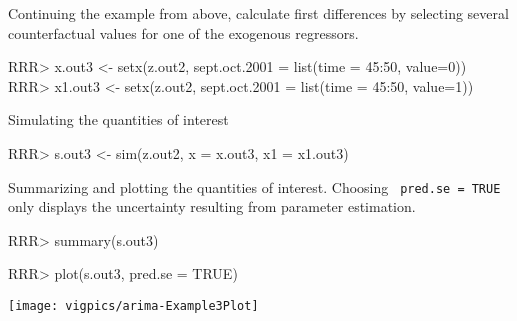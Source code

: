 \begin{enumerate}
Continuing the example from above, calculate first differences by
selecting several counterfactual values for one of the exogenous
regressors. 
\begin{Schunk}
\begin{Sinput}
RRR> x.out3 <- setx(z.out2, sept.oct.2001 = list(time = 45:50, value=0))
RRR> x1.out3 <- setx(z.out2, sept.oct.2001 = list(time = 45:50, value=1))
\end{Sinput}
\end{Schunk}
Simulating the quantities of interest
\begin{Schunk}
\begin{Sinput}
RRR> s.out3 <- sim(z.out2, x = x.out3, x1 = x1.out3)
\end{Sinput}
\end{Schunk}
Summarizing and plotting the quantities of interest. Choosing {\tt
pred.se = TRUE} only displays the uncertainty resulting from parameter
estimation.  
\begin{Schunk}
\begin{Sinput}
RRR> summary(s.out3)
\end{Sinput}
\end{Schunk}
\begin{center}
\begin{Schunk}
\begin{Sinput}
RRR> plot(s.out3, pred.se = TRUE) 
\end{Sinput}
\end{Schunk}
\texttt{[image: vigpics/arima-Example3Plot]}
\end{center} 
\end{enumerate}


